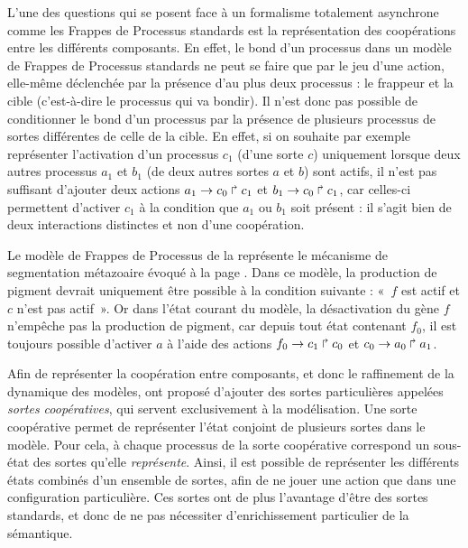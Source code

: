 L'une des questions qui se posent face à un formalisme totalement asynchrone comme
les Frappes de Processus standards est la représentation des coopérations entre les différents
composants.
En effet, le bond d'un processus dans un modèle de Frappes de Processus standards
ne peut se faire que par le jeu d'une action,
elle-même déclenchée par la présence d'au plus deux processus :
le frappeur et la cible (c'est-à-dire le processus qui va bondir).
Il n'est donc pas possible de conditionner le bond d'un processus par la présence
de plusieurs processus de sortes différentes de celle de la cible.
En effet,
si on souhaite par exemple représenter l'activation d'un processus $c_1$ (d'une sorte $c$)
uniquement lorsque deux autres processus $a_1$ et $b_1$ (de deux autres sortes $a$ et $b$)
sont actifs, il n'est pas suffisant d'ajouter deux actions
$a_1\rightarrow c_0\Rsh c_1$ et $b_1\rightarrow c_0\Rsh c_1$,
car celles-ci permettent d'activer $c_1$ à la condition que $a_1$ ou $b_1$
soit présent : il s'agit bien de deux interactions distinctes et non d'une coopération.

\begin{example}
  Le modèle de Frappes de Processus de la 
  représente le mécanisme de segmentation métazoaire évoqué à la page
  .
  Dans ce modèle, la production de pigment devrait uniquement être possible
  à la condition suivante : «~$f$ est actif et $c$ n'est pas actif~».
  Or dans l'état courant du modèle,
  la désactivation du gène $f$ n'empêche pas la production de pigment,
  car depuis tout état contenant $f_0$, il est toujours possible d'activer $a$
  à l'aide des actions $f_0\rightarrow c_1\Rsh c_0$ et $c_0\rightarrow a_0\Rsh a_1$.
\end{example}

Afin de représenter la coopération entre composants,
et donc le raffinement de la dynamique des modèles,
 ont proposé d'ajouter des sortes particulières appelées
\emph{sortes coopératives}, qui servent exclusivement à la modélisation.
Une sorte coopérative permet de représenter l'état conjoint de plusieurs sortes dans le modèle.
Pour cela, à chaque processus de la sorte coopérative correspond un sous-état des sortes
qu'elle \emph{représente}.
Ainsi, il est possible de représenter les différents états combinés d'un ensemble de sortes,
afin de ne jouer une action que dans une configuration particulière.
Ces sortes ont de plus l'avantage d'être des sortes standards,
et donc de ne pas nécessiter d'enrichissement particulier de la sémantique.

